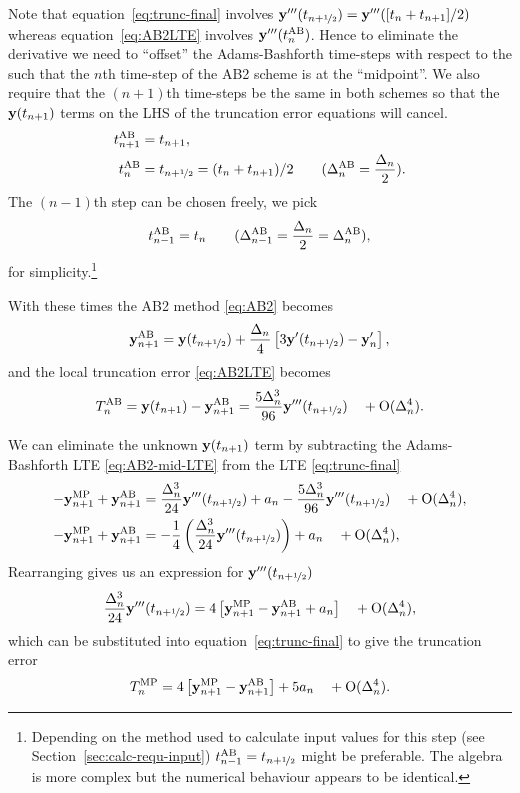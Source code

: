 Note that equation~\eqref{eq:trunc-final} involves $\yvhf['''] = \yv'''([t_n +t_{n+1}]/2)$ whereas equation~\eqref{eq:AB2LTE} involves $\yv'''(t_n^\AB)$.
Hence to eliminate the derivative we need to ``offset'' the Adams-Bashforth time-steps with respect to the \imr such that the $n$th time-step of the AB2 scheme is at the ``midpoint''.
We also require that the $(n+1)$th time-steps be the same in both schemes so that the $\yv(t_{n+1})$ terms on the LHS of the truncation error equations will cancel.
\begin{align}
  t_{n+1}^\AB &= t_{n+1}, \notag\\
  t_n^\AB &= \thf = (t_{n} + t_{n+1})/2  \qquad   (\dtn^\AB = \frac{\dtn}{2}).
  \label{eq:ab2-ts}
\end{align}
The $(n-1)$th step can be chosen freely, we pick
\begin{equation}
  t_{n-1}^\AB = t_n  \qquad   (\dtx{n-1}^\AB = \frac{\dtn}{2} = \dtn^\AB),
\end{equation}
for simplicity.\footnote{Depending on the method used to calculate input values for this step (see Section~\ref{sec:calc-requ-input}) $t_{n-1}^\AB = \thf$ might be preferable. The algebra is more complex but the numerical behaviour appears to be identical.}

With these times the AB2 method \eqref{eq:AB2} becomes
\begin{equation}
   \yv_{n+1}^{\AB} = \yvhf + \frac{\dtn}{4} \left[
     3 \yvhf['] - \yv_n' \right],
   \label{eq:AB2-mid}
\end{equation}
and the local truncation error \eqref{eq:AB2LTE} becomes
\begin{equation}
  \lte^\AB = \yv(t_{n+1}) -  \yv_{n+1}^{\AB}
  = \frac{5 \dtn^3}{96} \yvhf['''] \porder{\dtn^4}.
\label{eq:AB2-mid-LTE}
\end{equation}

We can eliminate the unknown $\yv(t_{n+1})$ term by subtracting the Adams-Bashforth LTE \eqref{eq:AB2-mid-LTE} from the \imr LTE \eqref{eq:trunc-final}
\begin{align}
 - \yv_{n+1}^{\IMP} + \yv_{n+1}^{\AB} &=
   \frac{\dtn^3}{24} \yvhf['''] + \ymiderr
  - \frac{5\dtn^3}{96} \yvhf[''']
  \porder{\dtn^4}, \notag \\
  - \yv_{n+1}^{\IMP} + \yv_{n+1}^{\AB} &= -\frac{1}{4} \left( \frac{\dtn^3}{24} \yvhf['''] \right)
  + \ymiderr
  \porder{\dtn^4},
\end{align}
Rearranging gives us an expression for $\yvhf[''']$
\begin{equation}
  \frac{\dtn^3}{24} \yvhf['''] = 4 \left[ \yv_{n+1}^\IMP - \yv_{n+1}^{\AB} + a_n \right]  \porder{\dtn^4},
\end{equation}
which can be substituted into equation~\eqref{eq:trunc-final} to give the truncation error
\begin{equation}
  \lte^\IMP = 4 \left[ \yv_{n+1}^\IMP - \yv_{n+1}^{\AB} \right] + 5 a_n
  \porder{\dtn^4}.
  \label{eq:50}
\end{equation}


